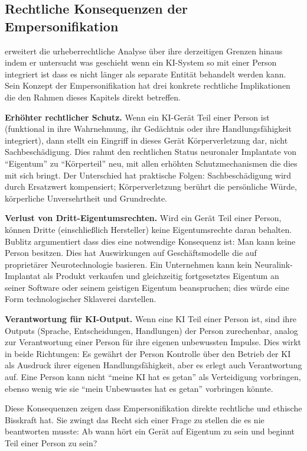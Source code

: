 \documentclass[acmlarge, noacm]{acmart}
\begin{document}
\subsection{Rechtliche Konsequenzen der Empersonifikation}

\citet{bublitz2024} erweitert die urheberrechtliche Analyse über ihre derzeitigen Grenzen hinaus indem er untersucht was geschieht wenn ein KI-System so mit einer Person integriert ist dass es nicht länger als separate Entität behandelt werden kann. Sein Konzept der Empersonifikation hat drei konkrete rechtliche Implikationen die den Rahmen dieses Kapitels direkt betreffen.

\textbf{Erhöhter rechtlicher Schutz.} Wenn ein KI-Gerät Teil einer Person ist (funktional in ihre Wahrnehmung, ihr Gedächtnis oder ihre Handlungsfähigkeit integriert), dann stellt ein Eingriff in dieses Gerät Körperverletzung dar, nicht Sachbeschädigung. Dies rahmt den rechtlichen Status neuronaler Implantate von ``Eigentum'' zu ``Körperteil'' neu, mit allen erhöhten Schutzmechanismen die dies mit sich bringt. Der Unterschied hat praktische Folgen: Sachbeschädigung wird durch Ersatzwert kompensiert; Körperverletzung berührt die persönliche Würde, körperliche Unversehrtheit und Grundrechte.

\textbf{Verlust von Dritt-Eigentumsrechten.} Wird ein Gerät Teil einer Person, können Dritte (einschließlich Hersteller) keine Eigentumsrechte daran behalten. Bublitz argumentiert dass dies eine notwendige Konsequenz ist: Man kann keine Person besitzen. Dies hat Auswirkungen auf Geschäftsmodelle die auf proprietärer Neurotechnologie basieren. Ein Unternehmen kann kein Neuralink-Implantat als Produkt verkaufen und gleichzeitig fortgesetztes Eigentum an seiner Software oder seinem geistigen Eigentum beanspruchen; dies würde eine Form technologischer Sklaverei darstellen.

\textbf{Verantwortung für KI-Output.} Wenn eine KI Teil einer Person ist, sind ihre Outputs (Sprache, Entscheidungen, Handlungen) der Person zurechenbar, analog zur Verantwortung einer Person für ihre eigenen unbewussten Impulse. Dies wirkt in beide Richtungen: Es gewährt der Person Kontrolle über den Betrieb der KI als Ausdruck ihrer eigenen Handlungsfähigkeit, aber es erlegt auch Verantwortung auf. Eine Person kann nicht ``meine KI hat es getan'' als Verteidigung vorbringen, ebenso wenig wie sie ``mein Unbewusstes hat es getan'' vorbringen könnte.

Diese Konsequenzen zeigen dass Empersonifikation direkte rechtliche und ethische Bisskraft hat. Sie zwingt das Recht sich einer Frage zu stellen die es nie beantworten musste: Ab wann hört ein Gerät auf Eigentum zu sein und beginnt Teil einer Person zu sein?
\end{document}
